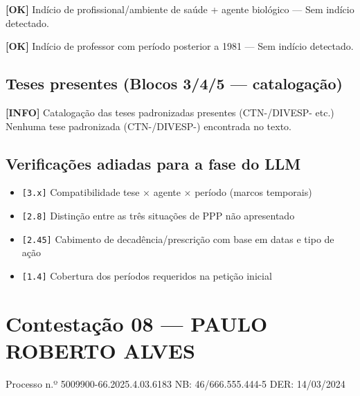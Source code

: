 \documentclass[12pt,a4paper]{article}
\newcommand{\statusOK}[1]{\textcolor{corOK}{\textbf{[OK]}} #1}
\newcommand{\statusINFO}[1]{\textcolor{corINFO}{\textbf{[INFO]}} #1}
\begin{document}
\medskip
\statusOK{Indício de profissional/ambiente de saúde + agente biológico} --- Sem indício detectado.

\medskip
\statusOK{Indício de professor com período posterior a 1981} --- Sem indício detectado.

\subsection{Teses presentes (Blocos 3/4/5 --- catalogação)}

\statusINFO{Catalogação das teses padronizadas presentes (CTN-/DIVESP- etc.)}\\
Nenhuma tese padronizada (CTN-/DIVESP-) encontrada no texto.

\subsection{Verificações adiadas para a fase do LLM}

\begin{itemize}
  \item \texttt{[3.x]} Compatibilidade tese × agente × período (marcos temporais)
  \item \texttt{[2.8]} Distinção entre as três situações de PPP não apresentado
  \item \texttt{[2.45]} Cabimento de decadência/prescrição com base em datas e tipo de ação
  \item \texttt{[1.4]} Cobertura dos períodos requeridos na petição inicial
\end{itemize}



\clearpage
{}
\section{Contestação 08 --- PAULO ROBERTO ALVES}
\begin{center}
  {\small Processo n.º 5009900-66.2025.4.03.6183 \quad NB: 46/666.555.444-5 \quad DER: 14/03/2024}
\end{center}
\end{document}
